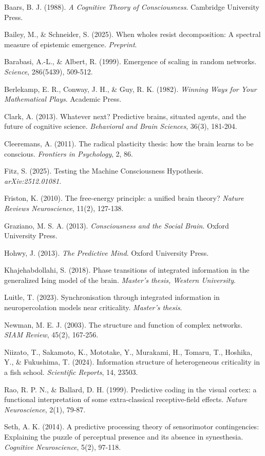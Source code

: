 \documentclass[
  11pt,
]{article}
\begin{document}
Baars, B. J. (1988). \emph{A Cognitive Theory of Consciousness}.
Cambridge University Press.

Bailey, M., \& Schneider, S. (2025). When wholes resist decomposition: A
spectral measure of epistemic emergence. \emph{Preprint}.

Barabasi, A.-L., \& Albert, R. (1999). Emergence of scaling in random
networks. \emph{Science}, 286(5439), 509-512.

Berlekamp, E. R., Conway, J. H., \& Guy, R. K. (1982). \emph{Winning
Ways for Your Mathematical Plays}. Academic Press.

Clark, A. (2013). Whatever next? Predictive brains, situated agents, and
the future of cognitive science. \emph{Behavioral and Brain Sciences},
36(3), 181-204.

Cleeremans, A. (2011). The radical plasticity thesis: how the brain
learns to be conscious. \emph{Frontiers in Psychology}, 2, 86.

Fitz, S. (2025). Testing the Machine Consciousness Hypothesis.
\emph{arXiv:2512.01081}.

Friston, K. (2010). The free-energy principle: a unified brain theory?
\emph{Nature Reviews Neuroscience}, 11(2), 127-138.

Graziano, M. S. A. (2013). \emph{Consciousness and the Social Brain}.
Oxford University Press.

Hohwy, J. (2013). \emph{The Predictive Mind}. Oxford University Press.

Khajehabdollahi, S. (2018). Phase transitions of integrated information
in the generalized Ising model of the brain. \emph{Master's thesis,
Western University}.

Luitle, T. (2023). Synchronisation through integrated information in
neuropercolation models near criticality. \emph{Master's thesis}.

Newman, M. E. J. (2003). The structure and function of complex networks.
\emph{SIAM Review}, 45(2), 167-256.

Niizato, T., Sakamoto, K., Mototake, Y., Murakami, H., Tomaru, T.,
Hoshika, Y., \& Fukushima, T. (2024). Information structure of
heterogeneous criticality in a fish school. \emph{Scientific Reports},
14, 23503.

Rao, R. P. N., \& Ballard, D. H. (1999). Predictive coding in the visual
cortex: a functional interpretation of some extra-classical
receptive-field effects. \emph{Nature Neuroscience}, 2(1), 79-87.

Seth, A. K. (2014). A predictive processing theory of sensorimotor
contingencies: Explaining the puzzle of perceptual presence and its
absence in synesthesia. \emph{Cognitive Neuroscience}, 5(2), 97-118.
\end{document}
